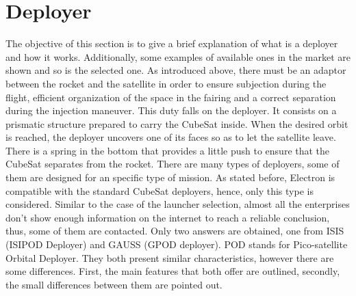 \section{Deployer}
The objective of this section is to give a brief explanation of what is a deployer and how it works. Additionally, some examples of available ones in the market are shown and so is the selected one.
\newline
As introduced above, there must be an adaptor between the rocket and the satellite in order to ensure subjection during the flight, efficient organization of the space in the fairing and a correct separation during the injection maneuver. This duty falls on the deployer. It consists on a prismatic structure prepared to carry the CubeSat inside. When the desired orbit is reached, the deployer uncovers one of its faces so as to let the satellite leave. There is a spring in the bottom that provides a little push to ensure that the CubeSat separates from the rocket. 
There are many types of deployers, some of them are designed for an specific type of mission. As stated before, Electron is compatible with the standard CubeSat deployers, hence, only this type is considered. Similar to the case of the launcher selection, almost all the enterprises don't show enough information on the internet to reach a reliable conclusion, thus, some of them are contacted. Only two answers are obtained, one from ISIS (ISIPOD Deployer) and GAUSS (GPOD deployer). POD stands for Pico-satellite Orbital Deployer. 
\newline
They both present similar characteristics, however there are some differences. First, the main features that both offer are outlined, secondly, the small differences between them are pointed out. 
